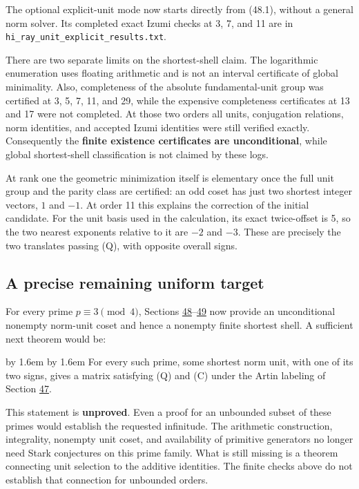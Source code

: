 \documentclass[11pt,reqno]{amsart}
\theoremstyle{plain}
\newenvironment{mdquote}%
  {\par\addvspace{0.5\baselineskip}\begingroup
   \advance\leftskip by 1.6em \advance\rightskip by 1.6em \noindent\ignorespaces}%
  {\par\endgroup\addvspace{0.5\baselineskip}}
\begin{document}
The optional explicit-unit mode now starts directly from (48.1),
without a general norm solver. Its completed exact Izumi checks at
3, 7, and 11 are in \texttt{hi\_\allowbreak ray\_\allowbreak unit\_\allowbreak explicit\_\allowbreak results.txt}.

There are two separate limits on the shortest-shell claim. The
logarithmic enumeration uses floating arithmetic and is not an
interval certificate of global minimality. Also, completeness of
the absolute fundamental-unit group was certified at 3, 5, 7, 11,
and 29, while the expensive completeness certificates at 13 and 17
were not completed. At those two orders all units, conjugation
relations, norm identities, and accepted Izumi identities were still
verified exactly. Consequently the \textbf{finite existence certificates
are unconditional}, while global shortest-shell classification is
not claimed by these logs.

At rank one the geometric minimization itself is elementary once
the full unit group and the parity class are certified: an odd
coset has just two shortest integer vectors, \(1\) and \(-1\).
At order 11 this explains the correction of the initial candidate.
For the unit basis used in the calculation, its exact twice-offset
is 5, so the two nearest exponents relative to it are \(-2\) and
\(-3\). These are precisely the two translates passing (Q), with
opposite overall signs.

\subsection{A precise remaining uniform target}\label{sec:49.3}

For every prime \(p\equiv3\pmod4\), Sections \hyperref[sec:48]{48}--\hyperref[sec:49]{49} now provide
an unconditional nonempty norm-unit coset and hence a nonempty
finite shortest shell. A sufficient next theorem would be:

\begin{mdquote}
For every such prime, some shortest norm unit, with one of its
two signs, gives a matrix satisfying (Q) and (C) under the Artin
labeling of Section \hyperref[sec:47]{47}.
\end{mdquote}

This statement is \textbf{unproved}. Even a proof for an unbounded
subset of these primes would establish the requested infinitude.
The arithmetic construction, integrality, nonempty unit coset,
and availability of primitive generators no longer need Stark
conjectures on this prime family. What is still missing is a theorem
connecting unit selection to the additive identities. The finite
checks above do not establish that connection for unbounded orders.
\end{document}
